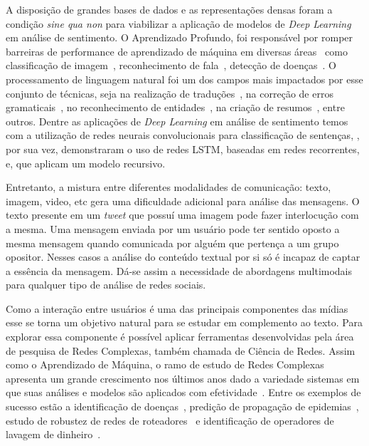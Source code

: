 A disposição de grandes bases de dados e as representações densas foram a
condição \textit{sine qua non} para viabilizar a aplicação de modelos de
\textit{Deep Learning} em análise de sentimento.
O Aprendizado Profundo, foi responsável por romper barreiras de performance
de aprendizado de máquina em diversas áreas~\cite{lecun15} como classificação
de imagem~\cite{krizhevsky12}, reconhecimento de fala~\cite{hinton12a}, detecção
de doenças~\cite{esteva17}.
O processamento de linguagem natural foi um dos campos mais impactados por esse
conjunto de técnicas, seja na realização de traduções~\cite{vaswani17},
na correção de erros gramaticais~\cite{ge18}, no reconhecimento de
entidades~\cite{akbik18}, na criação de resumos~\cite{wu18}, entre outros.
Dentre as aplicações de \textit{Deep Learning} em análise de sentimento
temos \citet{kim14} com a utilização de redes neurais convolucionais para
classificação de sentenças, \citet{zhou16}, por sua vez, demonstraram o uso de
redes LSTM, baseadas em redes recorrentes, e, \citet{socher13} que aplicam um
modelo recursivo.

Entretanto, a mistura entre diferentes modalidades de comunicação: texto, imagem,
video, etc gera uma dificuldade adicional para análise das mensagens.
O texto presente em um \textit{tweet} que possuí uma imagem pode fazer
interlocução com a mesma.
Uma mensagem enviada por um usuário pode ter sentido oposto a mesma mensagem
quando comunicada por alguém que pertença a um grupo opositor.
Nesses casos a análise do conteúdo textual por si só é incapaz de captar a
essência da mensagem.
Dá-se assim a necessidade de abordagens multimodais para qualquer tipo de
análise de redes sociais.

Como a interação entre usuários é uma das principais componentes das mídias esse
se torna um objetivo natural para se estudar em complemento ao texto.
Para explorar essa componente é possível aplicar ferramentas desenvolvidas pela
área de pesquisa de Redes Complexas, também chamada de Ciência de Redes.
Assim como o Aprendizado de Máquina, o ramo de estudo de Redes Complexas
apresenta um grande crescimento nos últimos anos dado a variedade sistemas em
que suas análises e modelos são aplicados com efetividade~\cite{albert02}.
Entre os exemplos de sucesso estão a identificação de doenças~\cite{barabasi11},
predição de propagação de epidemias~\cite{hufnagel04}, estudo de robustez de
redes de roteadores~\cite{albert00} e identificação de operadores de lavagem de
dinheiro~\cite{colladon17}.

